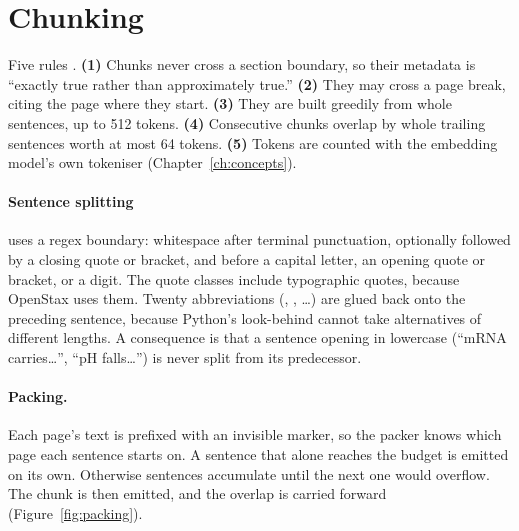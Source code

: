 \section{Chunking}
\label{sec:chunking}

Five rules . \textbf{(1)} Chunks never cross a section boundary, so their metadata is ``exactly true rather than approximately true.'' \textbf{(2)} They may cross a page break, citing the page where they start. \textbf{(3)} They are built greedily from whole sentences, up to 512 tokens. \textbf{(4)} Consecutive chunks overlap by whole trailing sentences worth at most 64 tokens. \textbf{(5)} Tokens are counted with the embedding model's own tokeniser (Chapter~\ref{ch:concepts}).

\paragraph{Sentence splitting} uses a regex boundary: whitespace after terminal punctuation, optionally followed by a closing quote or bracket, and before a capital letter, an opening quote or bracket, or a digit. The quote classes include typographic quotes, because OpenStax uses them. Twenty abbreviations (, , \ldots) are glued back onto the preceding sentence, because Python's look-behind cannot take alternatives of different lengths. \tagI{} A consequence is that a sentence opening in lowercase (``mRNA carries\ldots'', ``pH falls\ldots'') is never split from its predecessor.

\paragraph{Packing.} Each page's text is prefixed with an invisible  marker, so the packer knows which page each sentence starts on. A sentence that alone reaches the budget is emitted on its own. Otherwise sentences accumulate until the next one would overflow. The chunk is then emitted, and the overlap is carried forward (Figure~\ref{fig:packing}).

